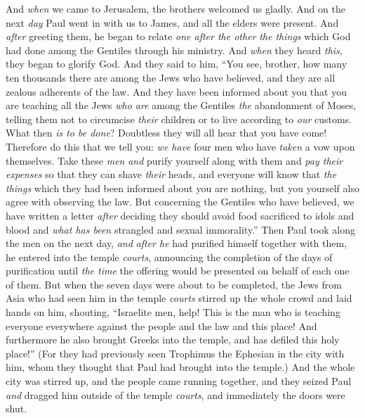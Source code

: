 \begin{biblechapter}
 And \textit{when} we came to Jerusalem, the brothers welcomed us gladly.
\verse And on the next \textit{day} Paul went in with us to James, and all the elders were present.
\verse And \textit{after} greeting them, he began to relate \textit{one after the other} \textit{the things} which God had done among the Gentiles through his ministry.
\verse And \textit{when} they heard \textit{this}, they began to glorify God. And they said to him, “You see, brother, how many ten thousands there are among the Jews who have believed, and they are all zealous adherents of the law.
\verse And they have been informed about you that you are teaching all the Jews \textit{who are} among the Gentiles \textit{the} abandonment of Moses, telling them not to circumcise \textit{their} children or to live according to \textit{our} customs.
\verse What then \textit{is to be done}? Doubtless they will all hear that you have come!
\verse Therefore do this that we tell you: \textit{we have} four men who have \textit{taken} a vow upon themselves.
\verse Take these \textit{men} \textit{and} purify yourself along with them and \textit{pay their expenses} so that they can shave \textit{their} heads, and everyone will know that \textit{the things} which they had been informed about you are nothing, but you yourself also agree with observing the law.
\verse But concerning the Gentiles who have believed, we have written a letter \textit{after} deciding they should avoid food sacrificed to idols and blood and \textit{what has been} strangled and sexual immorality.”
\verse Then Paul took along the men on the next day, \textit{and} \textit{after he} had purified himself together with them, he entered into the temple \textit{courts}, announcing the completion of the days of purification until \textit{the time} the offering would be presented on behalf of each one of them.
 But when the seven days were about to be completed, the Jews from Asia who had seen him in the temple \textit{courts} stirred up the whole crowd and laid hands on him,
\verse shouting, “Israelite men, help! This is the man who is teaching everyone everywhere against the people and the law and this place! And furthermore he also brought Greeks into the temple, and has defiled this holy place!”
\verse (For they had previously seen Trophimus the Ephesian in the city with him, whom they thought that Paul had brought into the temple.)
\verse And the whole city was stirred up, and the people came running together, and they seized Paul \textit{and} dragged him outside of the temple \textit{courts}, and immediately the doors were shut.

\end{biblechapter}
